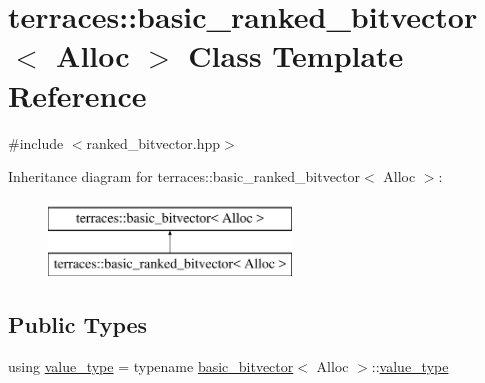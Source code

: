 \hypertarget{classterraces_1_1basic__ranked__bitvector}{}\section{terraces\+:\+:basic\+\_\+ranked\+\_\+bitvector$<$ Alloc $>$ Class Template Reference}
\label{classterraces_1_1basic__ranked__bitvector}


{\ttfamily \#include $<$ranked\+\_\+bitvector.\+hpp$>$}

Inheritance diagram for terraces\+:\+:basic\+\_\+ranked\+\_\+bitvector$<$ Alloc $>$\+:\begin{figure}[H]
\begin{center}
\leavevmode
\includegraphics[height=2.000000cm]{classterraces_1_1basic__ranked__bitvector}
\end{center}
\end{figure}
\subsection*{Public Types}
\begin{DoxyCompactItemize}
\item 
using \hyperlink{classterraces_1_1basic__ranked__bitvector_affd5ab8cf4bfba9184dbdd57f4d07bcb}{value\+\_\+type} = typename \hyperlink{classterraces_1_1basic__bitvector}{basic\+\_\+bitvector}$<$ Alloc $>$\+::\hyperlink{classterraces_1_1basic__ranked__bitvector_affd5ab8cf4bfba9184dbdd57f4d07bcb}{value\+\_\+type}
\end{DoxyCompactItemize}
